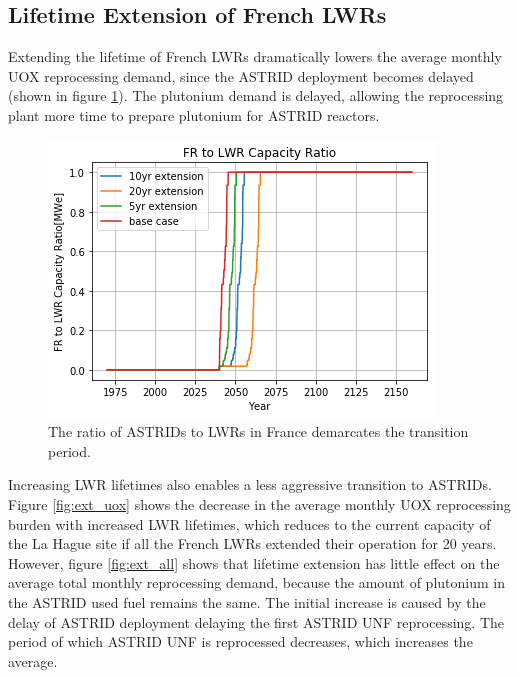 \subsection{Lifetime Extension of French \glspl{LWR}}\label{sec:life}
Extending the lifetime of French \glspl{LWR} dramatically lowers the average
monthly \gls{UOX} reprocessing demand, since the \gls{ASTRID} deployment becomes 
delayed (shown in figure \ref{fig:pow_diff}). The plutonium demand is delayed,
 allowing the reprocessing plant more time to prepare plutonium for \gls{ASTRID} reactors.

\begin{figure}[htbp!]
    \begin{center}
        \includegraphics[height=0.25\textheight]{./images/sensitivity/pow_ratio.png}
    \end{center}
    \caption{The ratio of \glspl{ASTRID} to \glspl{LWR} in France demarcates 
    the transition period.}
    \label{fig:pow_diff}
\end{figure}

 Increasing \gls{LWR} lifetimes also enables a less aggressive transition to 
 \glspl{ASTRID}. 
Figure \ref{fig:ext_uox} shows the decrease in the average monthly
\gls{UOX} reprocessing burden with increased \gls{LWR} lifetimes,
which reduces to the current capacity of the La Hague site if all the
French \glspl{LWR} extended their operation for 20 years.
However, figure \ref{fig:ext_all} shows that lifetime extension has little
effect on the average total monthly reprocessing demand, because
the amount of plutonium in the \gls{ASTRID} used fuel remains the same.
The initial increase is caused by the delay of \gls{ASTRID} deployment
delaying the first \gls{ASTRID} \gls{UNF} reprocessing. The period of which
\gls{ASTRID} \gls{UNF} is reprocessed decreases, which increases
the average.

